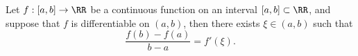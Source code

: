 

\begin{theorem}
Let $f:[a,b]\to\RR$ be a continuous function on an interval 
$[a,b]\subset\RR$, and suppose that $f$ is differentiable 
on $(a,b)$, then there exists $\xi\in (a,b)$ such that
$$
\frac{f(b)-f(a)}{b-a}=f'(\xi).
$$
\end{theorem}


